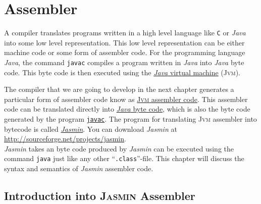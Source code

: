 \chapter{Assembler}
A compiler translates programs written in a high level language like \texttt{C} or
\textsl{Java} into some low level representation.  This low level representation can be
either machine code or some form of assembler code.  For the programming language \textsl{Java},
the command \texttt{javac} compiles a program written in \textsl{Java} into
\textsl{Java} byte code.  This byte code is then executed using the 
\href{http://en.wikipedia.org/wiki/Java_virtual_machine}{\textsl{Java} virtual machine}
(\textsc{Jvm}).

The compiler that we are going to
develop in the next chapter generates a particular form of assembler code know as
\href{http://jasmin.sourceforge.net}{\textsc{Jvm} assembler code}.
This assembler code can be translated directly into
\href{http://en.wikipedia.org/wiki/Java_bytecode}{\textsl{Java} byte code}, which 
is also the byte code generated by the program \href{https://en.wikipedia.org/wiki/javac}{\texttt{javac}}.  The
program for translating \textsc{Jvm} 
assembler into bytecode is called \href{http://jasmin.sourceforge.net}{\textsl{Jasmin}}.
You can download \textsl{Jasmin} at
\\[0.2cm]
\hspace*{1.3cm}
\href{http://sourceforge.net/projects/jasmin}{http://sourceforge.net/projects/jasmin}.
\\[0.2cm]
\textsl{Jasmin} takes an byte code produced by \textsl{Jasmin} can be executed using the
command  \texttt{java} just like any other ``\texttt{.class}''-file.  
This chapter will discuss the syntax and semantics of \textsl{Jasmin} assembler code.



\section{Introduction into \textsc{Jasmin} Assembler}

